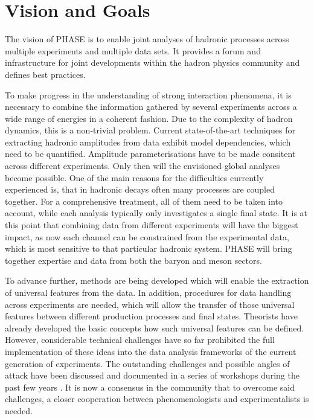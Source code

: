 \section{Vision and Goals}

The vision of PHASE is to enable joint analyses of hadronic processes across multiple experiments and multiple data sets. It provides a forum and infrastructure for joint developments within the hadron physics community and defines best practices.

To make progress in the understanding of strong interaction phenomena, it is necessary to combine the information gathered by several experiments across a wide range of energies in a coherent fashion. Due to the complexity of hadron dynamics, this is a non-trivial problem. Current state-of-the-art techniques for extracting hadronic amplitudes from data exhibit model dependencies, which need to be quantified. Amplitude parameterisations have to be made consitent across different experiments. Only then will the envisioned global analyses become possible. One of the main reasons for the difficulties currently experienced is, that in hadronic decays often many processes are coupled together. For a comprehensive treatment, all of them need to be taken into account, while each analysis typically only investigates a single final state. It is at this point that combining data from different experiments will have the biggest impact, as now each channel can be constrained from the experimental data, which is most sensitive to that particular hadronic system. PHASE will bring together expertise and data from both the baryon and meson sectors.

To advance further, methods are being developed which will enable the extraction of universal features from the data. In addition, procedures for data handling across experiments are needed, which will allow the transfer of those universal features between different production processes and final states. Theorists have already developed the basic concepts how such universal features can be defined. However, considerable technical challenges have so far prohibited the full implementation of these ideas into the data analysis frameworks of the current generation of experiments. The outstanding challenges and possible angles of attack have been discussed and documented in a series of workshops during the past few years \cite{Battaglieri_2015, Brice_o_2016, Lutz_2016}. It is now a consensus in the community that to overcome said challenges, a closer cooperation between phenomenologists and experimentalists is needed. 

